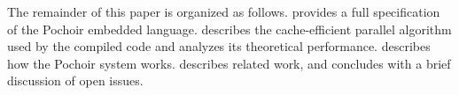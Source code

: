 The remainder of this paper is organized as follows.  
provides a full specification of the Pochoir embedded language.
 describes the cache-efficient parallel algorithm used by
the compiled code and analyzes its theoretical performance.
 describes how the Pochoir system works.  
describes related work, and  concludes with a brief
discussion of open issues.


